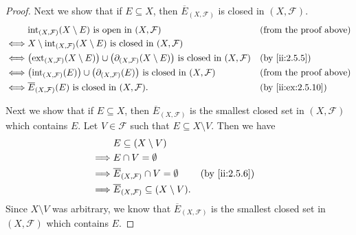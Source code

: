 \begin{proof}
  Next we show that if \(E \subseteq X\), then \(\overline{E}_{(X, \mathcal{F})}\) is closed in \((X, \mathcal{F})\).
  \begin{align*}
         & \text{int}_{(X, \mathcal{F})}(X \setminus E) \text{ is open in } (X, \mathcal{F})                                                                       &  & \text{(from the proof above)} \\
    \iff & X \setminus \text{int}_{(X, \mathcal{F})}(X \setminus E) \text{ is closed in } (X, \mathcal{F})                                                                                            \\
    \iff & \big(\text{ext}_{(X, \mathcal{F})}(X \setminus E)\big) \cup \big(\partial_{(X, \mathcal{F})}(X \setminus E)\big) \text{ is closed in } (X, \mathcal{F}) &  & \by{ii:2.5.5}                 \\
    \iff & \big(\text{int}_{(X, \mathcal{F})}(E)\big) \cup \big(\partial_{(X, \mathcal{F})}(E)\big) \text{ is closed in } (X, \mathcal{F})                         &  & \text{(from the proof above)} \\
    \iff & \overline{E}_{(X, \mathcal{F})}(E) \text{ is closed in } (X, \mathcal{F}).                                                                              &  & \by{ii:ex:2.5.10}
  \end{align*}

  Next we show that if \(E \subseteq X\), then \(\overline{E}_{(X, \mathcal{F})}\) is the smallest closed set in \((X, \mathcal{F})\) which contains \(E\).
  Let \(V \in \mathcal{F}\) such that \(E \subseteq X \setminus V\).
  Then we have
  \begin{align*}
             & E \subseteq (X \setminus V)                                                   \\
    \implies & E \cap V = \emptyset                                                          \\
    \implies & \overline{E}_{(X, \mathcal{F})} \cap V = \emptyset         &  & \by{ii:2.5.6} \\
    \implies & \overline{E}_{(X, \mathcal{F})} \subseteq (X \setminus V).
  \end{align*}
  Since \(X \setminus V\) was arbitrary, we know that \(\overline{E}_{(X, \mathcal{F})}\) is the smallest closed set in \((X, \mathcal{F})\) which contains \(E\).


\end{proof}
